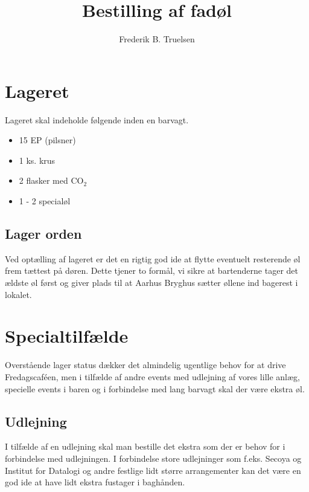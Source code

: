 

\title{Bestilling af fadøl}
\date{}
\author{Frederik B. Truelsen}



\maketitle

\section{Lageret}

Lageret skal indeholde følgende inden en barvagt.

\begin{itemize}
\item 15 EP (pilsner)
\item 1 ks. krus
\item 2 flasker med CO$_{2}$
\item 1 - 2 specialøl
\end{itemize}

\subsection{Lager orden}

Ved optælling af lageret er det en rigtig god ide at flytte eventuelt resterende øl frem tættest på døren.
Dette tjener to formål, vi sikre at bartenderne tager det ældste øl først og giver plads til at Aarhus Bryghus
sætter øllene ind bagerest i lokalet.

\section{Specialtilfælde}

Overstående lager status dækker det almindelig ugentlige behov for at drive Fredagscaféen,
men i tilfælde af andre events med udlejning af vores lille anlæg, specielle events i baren og
i forbindelse med lang barvagt skal der være ekstra øl.

\subsection{Udlejning}

I tilfælde af en udlejning skal man bestille det ekstra som der er behov for i forbindelse med
udlejningen. I forbindelse store udlejninger som f.eks. Secoya og Institut for Datalogi og andre
festlige lidt større arrangementer  kan det være en god ide at have lidt ekstra fustager i baghånden.

